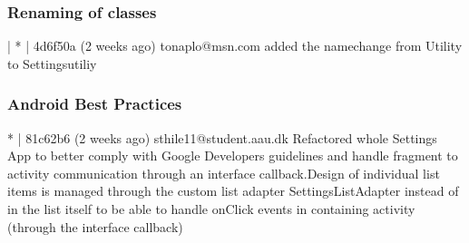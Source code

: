 \subsubsection{Renaming of classes}
| * | 4d6f50a (2 weeks ago) tonaplo@msn.com added the namechange from Utility to Settingsutiliy\\

\subsubsection{Android Best Practices}
* | 81c62b6 (2 weeks ago) sthile11@student.aau.dk Refactored whole Settings App to better comply with Google Developers guidelines and handle fragment to activity communication through an interface callback.Design of individual list items is managed through the custom list adapter SettingsListAdapter instead of in the list itself to be able to handle onClick events in containing activity (through the interface
 callback)\\